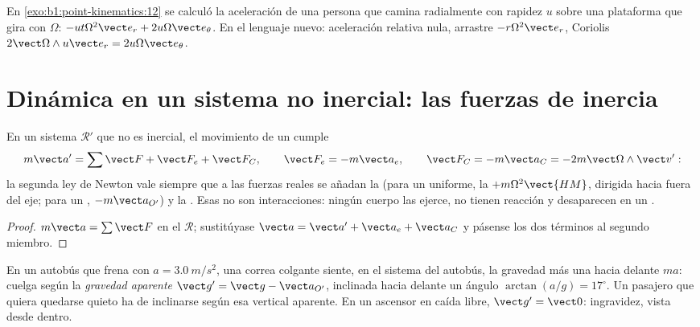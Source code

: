\begin{example}\label{ex:b1:non-inertial-frames:turntable}
En \cref{exo:b1:point-kinematics:12} se calculó la aceleración de una
persona que camina radialmente con rapidez $u$ sobre una plataforma que
gira con $\Omega$: $-ut\Omega^2\vect e_r
+ 2u\Omega\vect e_\theta$. En el lenguaje nuevo: aceleración relativa nula,
arrastre $-r\Omega^2\vect e_r$, Coriolis $2\vect\Omega\wedge u\vect e_r = 2u\Omega\vect e_\theta$.
\end{example}

\section{Dinámica en un sistema no inercial: las fuerzas de inercia}

\begin{theorem}\label{thm:b1:non-inertial-frames:dynamics}
En un sistema $\mathcal R'$ que no es inercial, el movimiento de un  cumple
\[
m\vect a' = \sum\vect F + \vect F_e + \vect F_C, \qquad
\vect F_e = -m\vect a_e, \qquad \vect F_C = -m\vect a_C = -2m\vect\Omega\wedge\vect v' :
\]
la segunda ley de Newton vale siempre que a las fuerzas reales se añadan
la \emph{} (para un  uniforme, la
\emph{} $+m\Omega^2\vect{HM}$, dirigida hacia fuera del
eje; para un , $-m\vect a_{O'}$) y la \emph{}. Esas \emph{} no son interacciones: ningún
cuerpo las ejerce, no tienen reacción y desaparecen en un .
\end{theorem}

\begin{proof}
$m\vect a = \sum\vect F$ en el  $\mathcal R$; sustitúyase
$\vect a = \vect a' + \vect a_e + \vect a_C$ y pásense los dos términos al
segundo miembro.
\end{proof}

\begin{example}\label{ex:b1:non-inertial-frames:bus}
En un autobús que frena con $a = \qty{3.0}{m/s^2}$, una correa colgante
siente, en el sistema del autobús, la gravedad más una 
hacia delante $ma$: cuelga según la \emph{gravedad aparente}
$\vect g' = \vect g - \vect a_{O'}$, inclinada hacia delante un ángulo
$\arctan(a/g) = 17^\circ$. Un pasajero que quiera quedarse quieto ha de
inclinarse según esa vertical aparente. En un ascensor en caída libre,
$\vect g' = \vect 0$: ingravidez, vista desde dentro.
\end{example}

